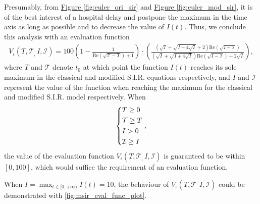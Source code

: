 \documentclass{article}
\newcommand{\MRef}[2]{\hyperref[#2]{#1 \ref*{#2}}}
\begin{document}
Presumably, from \MRef{Figure}{fig:euler_ori_sir} and \MRef{Figure}{fig:euler_mod_sir}, it is of the best interest of a hospital delay and postpone the maximum in the time axis as long as possible and to decrease the value of $I(t)$. Thus, we conclude this analysis with an evaluation function
\begin{gather}
\label{eqn:eval_func_mod_sir}
V_\iota\left(T,\mathcal{T}_,\,I,\mathcal{I}\right)= 100\left(1-\frac{1}{\mathrm{Re}\left(\sqrt{\mathcal{T}-T}\right)+1}\right)\cdot\left(\frac{\left(\sqrt{I}+\sqrt{I+4 \sqrt{I}}+2\right) \mathrm{Re}\left(\sqrt{I-\mathcal{I}}\right)}{\left(\sqrt{I}+\sqrt{I+4 \sqrt{I}}\right) \mathrm{Re}\left(\sqrt{I-\mathcal{I}}\right)+2 \sqrt{I}}\right),
\end{gather}
where $T$ and $\mathcal{T}$ denote $t_0$ at which point the function $I(t)$ reaches its sole maximum in the classical and modified S.I.R. equations respectively, and $I$ and $\mathcal{I}$ represent the value of the function when reaching the maximum for the classical and modified S.I.R. model respectively. When
\[
\begin{dcases}
T\geq0\\
\mathcal{T}\geq T\\
I>0\\
\mathcal{I}\geq I
\end{dcases},
\]
the value of the evaluation function $V_\iota\left(T,\mathcal{T}_,\,I,\mathcal{I}\right)$ is guaranteed to be within $[0,100]$, which would suffice the requirement of an evaluation function.

When $\displaystyle{I=\max_{t\in[0,+\infty)}I(t)=10}$, the behaviour of $V_\iota\left(T,\mathcal{T}_,\,I,\mathcal{I}\right)$ could be demonstrated with \ref{fig:msir_eval_func_plot}.
\end{document}
